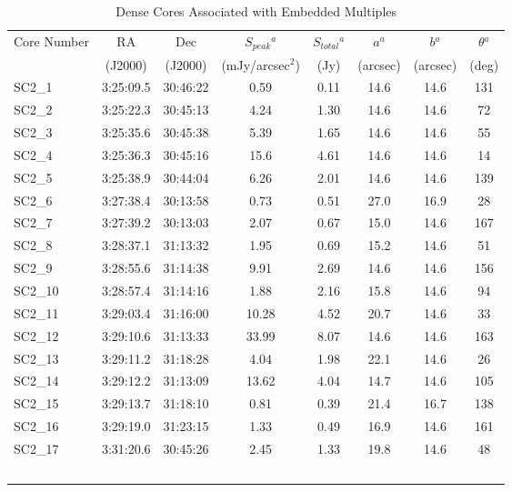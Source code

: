 \documentclass[usenatbib,a4paper]{mnras}
\newcommand{\fpeak}{\mbox{mJy/arcsec$^{2}$}}%
\begin{document}
\begin{table*}
\begin{threeparttable}
\caption{Dense Cores Associated with Embedded Multiples}\label{coreTable}
\begin{tabular}{lccccccc}
\hline\hline
Core	Number & RA			&	Dec	       & $S_{peak}$$^{a}$ & $S_{total}$$^{a}$	&  $a$$^{a}$	&   $b$$^{a}$	&  $\theta$$^{a}$\\
	&(J2000)		&	(J2000)   & 		  (\fpeak) 	 &	(Jy)	&(arcsec) & (arcsec)	& (deg) \\
\hline
SC2\_1 	& 3:25:09.5 & 30:46:22 &     0.59 	&   0.11 	&  14.6 &  14.6 &   131  \\  
SC2\_2 	& 3:25:22.3 & 30:45:13 &     4.24 	&   1.30 	&  14.6 &  14.6 &   72  \\	
SC2\_3 	& 3:25:35.6 & 30:45:38 &    5.39 	&   1.65 	&  14.6 &  14.6 &   55  \\
SC2\_4	& 3:25:36.3 & 30:45:16 &    15.6 	&   4.61 	&  14.6 &  14.6 &   14  \\	
SC2\_5   	& 3:25:38.9 & 30:44:04 &     6.26 	&   2.01 	&  14.6 &  14.6 &   139  \\	
SC2\_6 	& 3:27:38.4 & 30:13:58 &     0.73 	&   0.51 	&  27.0 &  16.9 &   28  \\	
SC2\_7 	& 3:27:39.2 & 30:13:03 &     2.07 	&   0.67 	&  15.0 &  14.6 &   167  \\	
SC2\_8 	& 3:28:37.1 & 31:13:32 &     1.95 	&   0.69 	&  15.2 &  14.6 &   51  \\	
SC2\_9   	& 3:28:55.6 & 31:14:38 &     9.91 	&   2.69 	&  14.6 &  14.6 &   156  \\	
SC2\_10 	& 3:28:57.4 & 31:14:16 &     1.88 	&   2.16 	&  15.8 &  14.6 &   94  \\	
SC2\_11   & 3:29:03.4 & 31:16:00 &     10.28  	&  4.52 	&  20.7 &  14.6 &   33  \\	
SC2\_12   & 3:29:10.6 & 31:13:33 &    33.99 	&  8.07 	&  14.6 &  14.6 &   163  \\	
SC2\_13 	& 3:29:11.2 & 31:18:28 &    4.04 	&   1.98 	&  22.1 &  14.6 &   26  \\	
SC2\_14   & 3:29:12.2 & 31:13:09 &    13.62 	&  4.04 	&  14.7 &  14.6 &   105  \\	
SC2\_15 	& 3:29:13.7 & 31:18:10 &     0.81 	&   0.39	&  21.4 &  16.7 &   138  \\	 
SC2\_16 	& 3:29:19.0 & 31:23:15 &    1.33 	&   0.49 	&  16.9 &  14.6 &   161  \\	
SC2\_17 	& 3:31:20.6 & 30:45:26 &    2.45 	&   1.33 	&  19.8 &  14.6 &   48  \\	
$$
\end{tabular}
\end{threeparttable}
\end{table*}
\end{document}
